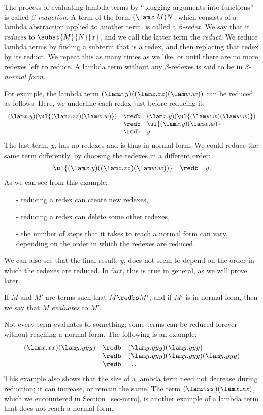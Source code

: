 \documentclass[12pt]{article}
\begin{document}
The process of evaluating lambda terms by ``plugging arguments into
functions'' is called {\em $\beta$-reduction}. A term of the form
$(\lam x.M)N$, which consists of a lambda abstraction applied to
another term, is called a {\em $\beta$-redex}. We say that it {\em
  reduces} to $\subst{M}{N}{x}$, and we call the latter term the {\em
  reduct}. We reduce lambda terms by finding a subterm that is a
redex, and then replacing that redex by its reduct. We repeat this as
many times as we like, or until there are no more redexes left to
reduce. A lambda term without any $\beta$-redexes is said to be in {\em
  $\beta$-normal form}.

For example, the lambda term $(\lam x.y)((\lam z.zz)(\lam w.w))$ can
be reduced as follows. Here, we underline each redex just before
reducing it:
\[ \begin{array}{lll}
  (\lam x.y)(\ul{(\lam z.zz)(\lam w.w)}) 
  &\redb& (\lam x.y)(\ul{(\lam w.w)(\lam w.w)}) \\
  &\redb& \ul{(\lam x.y)(\lam w.w)} \\
  &\redb& y.
\end{array}
\]
The last term, $y$, has no redexes and is thus in normal form.
We could reduce the same term differently, by choosing the redexes in
a different order:
\[ \begin{array}{lll}
  \ul{(\lam x.y)((\lam z.zz)(\lam w.w))}
  &\redb& y.
\end{array}
\]
As we can see from this example:
\begin{itemize}
\item[-] reducing a redex can create new redexes,
\item[-] reducing a redex can delete some other redexes,
\item[-] the number of steps that it takes to reach a normal form
  can vary, depending on the order in which the redexes are reduced.
\end{itemize}
We can also see that the final result, $y$, does not seem to depend on
the order in which the redexes are reduced. In fact, this is true in
general, as we will prove later.

If $M$ and $M'$ are terms such that $M\redbs M'$, and if $M'$ is in
normal form, then we say that $M$ {\em evaluates} to $M'$. 

Not every term evaluates to something; some terms can be reduced
forever without reaching a normal form. The following is an example:
\[ \begin{array}{lll}
  (\lam x.xx)(\lam y.yyy) 
  &\redb& (\lam y.yyy)(\lam y.yyy) \\
  &\redb& (\lam y.yyy)(\lam y.yyy)(\lam y.yyy) \\
  &\redb& \ldots
\end{array}
\]
This example also shows that the size of a lambda term need not
decrease during reduction; it can increase, or remain the same. The
term $(\lam x.xx)(\lam x.xx)$, which we encountered in
Section~\ref{sec-intro}, is another example of a lambda term that
does not reach a normal form. 
\end{document}
